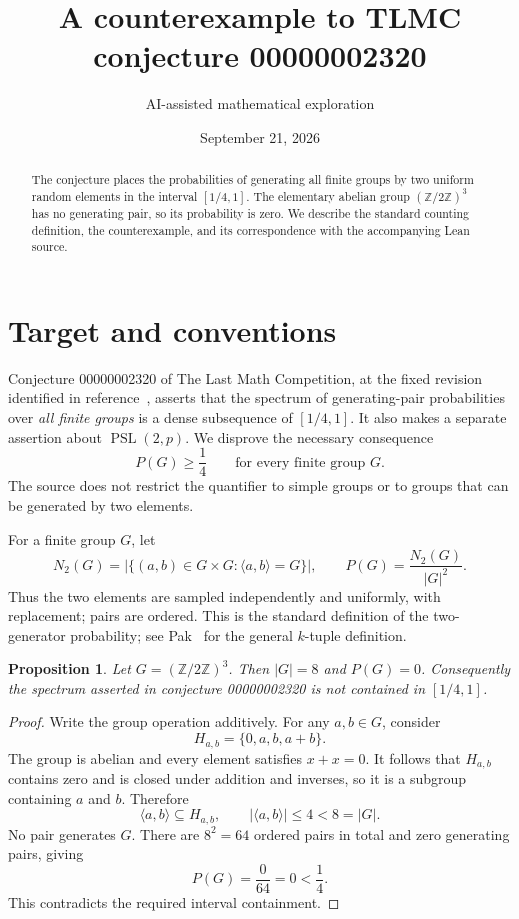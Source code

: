 \documentclass[11pt]{article}
\title{A counterexample to TLMC conjecture 00000002320}
\author{AI-assisted mathematical exploration}
\date{September 21, 2026}
\newtheorem{proposition}{Proposition}
\begin{document}
\maketitle

\begin{abstract}
The conjecture places the probabilities of generating all finite groups by two
uniform random elements in the interval $[1/4,1]$.  The elementary abelian group
$(\mathbb Z/2\mathbb Z)^3$ has no generating pair, so its probability is zero.
We describe the standard counting definition, the counterexample, and its
correspondence with the accompanying Lean source.
\end{abstract}

\section*{Target and conventions}
Conjecture 00000002320 of The Last Math Competition, at the fixed revision
identified in reference~\cite{tlmc}, asserts that the spectrum of generating-pair
probabilities over \emph{all finite groups} is a dense subsequence of $[1/4,1]$.
It also makes a separate assertion about $\operatorname{PSL}(2,p)$.
We disprove the necessary consequence
\[
  P(G)\geq \frac14\qquad\text{for every finite group }G.
\]
The source does not restrict the quantifier to simple groups or to groups that
can be generated by two elements.

For a finite group $G$, let
\[
 N_2(G)=\bigl|\{(a,b)\in G\times G:\langle a,b\rangle=G\}\bigr|,
 \qquad P(G)=\frac{N_2(G)}{|G|^2}.
\]
Thus the two elements are sampled independently and uniformly, with replacement;
pairs are ordered.  This is the standard definition of the two-generator
probability; see Pak~\cite[p.~3]{pak} for the general $k$-tuple definition.

\begin{proposition}
Let $G=(\mathbb Z/2\mathbb Z)^3$.  Then $|G|=8$ and $P(G)=0$.
Consequently the spectrum asserted in conjecture 00000002320 is not contained
in $[1/4,1]$.
\end{proposition}

\begin{proof}
Write the group operation additively.  For any $a,b\in G$, consider
\[
 H_{a,b}=\{0,a,b,a+b\}.
\]
The group is abelian and every element satisfies $x+x=0$.  It follows that
$H_{a,b}$ contains zero and is closed under addition and inverses, so it is a
subgroup containing $a$ and $b$.  Therefore
\[
  \langle a,b\rangle\subseteq H_{a,b},
  \qquad |\langle a,b\rangle|\leq 4<8=|G|.
\]
No pair generates $G$.  There are $8^2=64$ ordered pairs in total and zero
generating pairs, giving
\[
  P(G)=\frac{0}{64}=0<\frac14.
\]
This contradicts the required interval containment.
\end{proof}
\end{document}
